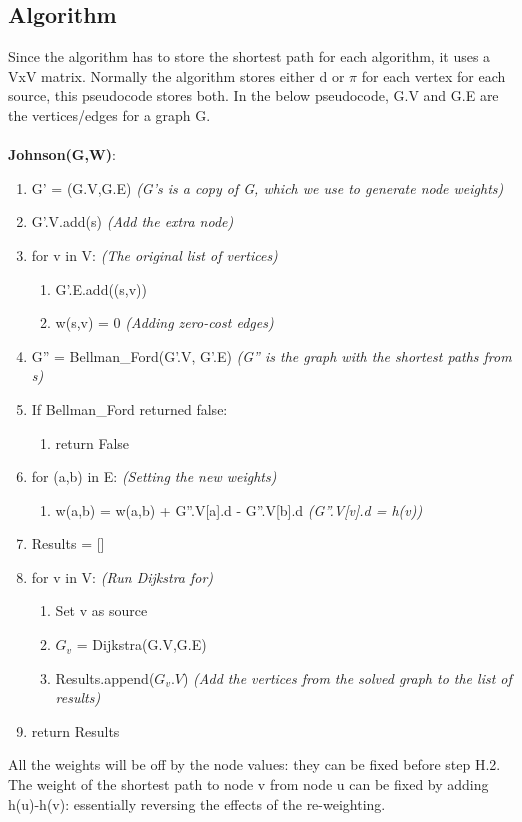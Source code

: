 \subsection{Algorithm}
Since the algorithm has to store the shortest path for each algorithm, it uses a VxV matrix. Normally the algorithm stores either d or $\pi$ for each vertex for each source, this pseudocode stores both. In the below pseudocode, G.V and G.E are the vertices/edges for a graph G.\\ \\
\textbf{Johnson(G,W)}:
\begin{enumerate}[label=\Alph*]
    \item G' = (G.V,G.E) \emph{(G's is a copy of G, which we use to generate node weights)}
    \item G'.V.add(s) \emph{(Add the extra node)}
    \item  for v in V: \emph{(The original list of vertices)}
\begin{enumerate}[label=\arabic*]
        \item G'.E.add((s,v))
        \item w(s,v) = 0  \emph{(Adding zero-cost edges)}
\end{enumerate}        
    \item G'' = Bellman\_Ford(G'.V, G'.E) \emph{(G'' is the graph with the shortest paths from s)}
    \item If Bellman\_Ford returned false:
    \begin{enumerate}
        \item [] return False
    \end{enumerate}    
    \item  for (a,b) in E: \emph{(Setting the new weights)}
    \begin{enumerate}
        \item [] w(a,b) = w(a,b) + G''.V[a].d -  G''.V[b].d  \quad \emph{(G''.V[v].d = h(v))}
    \end{enumerate}
    \item Results = []
    \item for v in V: \emph{(Run Dijkstra for)}
\begin{enumerate}[label=\arabic*]
    \item Set v as source
    \item $G_v$ = Dijkstra(G.V,G.E) 
    \item Results.append($G_v.V$) \emph{(Add the vertices from the solved graph to the list of results)}
\end{enumerate}    
    \item return Results
\end{enumerate}
All the weights will be off by the node values: they can be fixed before step H.2. The weight of the shortest path to node v from node u can be fixed by adding h(u)-h(v): essentially reversing the effects of the re-weighting. 